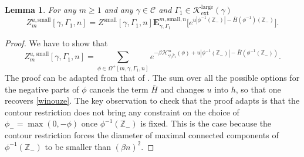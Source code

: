\documentclass[JEP,XML,SOM,Unicode, NoFloatCountersInSection]{cedram}
\let\mathcal\mathscr
\numberwithin{equation}{section}
\theoremstyle{plain}
\newtheorem{lemma}[theorem]{Lemma}
\theoremstyle{definition}
\newcommand{\ext}{\mathrm{ext}}
\newcommand{\sm}{\mathrm{small}}
\newcommand{\larg}{\mathrm{large}}
\newcommand{\cH}{{\ensuremath{\mathcal H}} }
\newcommand{\cC}{{\ensuremath{\mathcal C}} }
\newcommand{\cK}{{\ensuremath{\mathcal K}} }
\newcommand{\bE}{{\ensuremath{\mathbf E}} }
\newcommand{\bbZ}{{\ensuremath{\mathbb Z}} }
\newcommand{\gb}{\beta}
\newcommand{\gG}{\Gamma}
\newcommand{\gO}{\Omega}
\begin{document}
\begin{lemma}\label{zilak}
For any $m\ge 1$ and any $\gamma\in \cC$ and $\gG_1\in \cK^{\larg}_{\ext}(\gamma)$
\begin{equation*}%
Z^{u,\sm}_{m}[\gamma,\Gamma_1,n]= Z^{\sm}[\gamma,\gG_1,n] \bE^{m,\sm,n}_{\gamma,\gG_1}\bigl[ e^{u |\phi^{-1}(\bbZ_-)|- \bar H(\phi^{-1})(\bbZ_-)}\bigr].
\end{equation*}
\end{lemma}
\begin{proof}
We have to show that
\begin{equation*}
Z^{u,\sm}_{m}[\gamma,\Gamma_1,n]= \sum_{\phi \in \gO^+[m,\gamma,\gG_1,n]}e^{-\gb \cH^m_{\bar \gamma \setminus \bar \gG_1}(\phi)+u|\phi^{-1}(\bbZ_-)|-\bar H(\phi^{-1}(\bbZ_-))}.
\end{equation*}
The proof can be adapted from that of \cite[Lem.\,3.1]{cf:part1}. The sum over all the possible options for
the negative parts of $\phi$ cancels the term $\bar H$ and changes $u$ into $h$, so that one recovers \eqref{winouze}.
The key observation to check that the proof adapts is that
the contour restriction does not bring any constraint on the choice of $\phi_-=\max(0,-\phi)$ once $\phi^{-1}(\bbZ_-)$ is fixed.
This is the case
because the contour restriction forces the diameter of maximal connected components of $\phi^{-1}(\bbZ_-)$
to be smaller than $(\gb n)^2$.
\end{proof}
\end{document}
